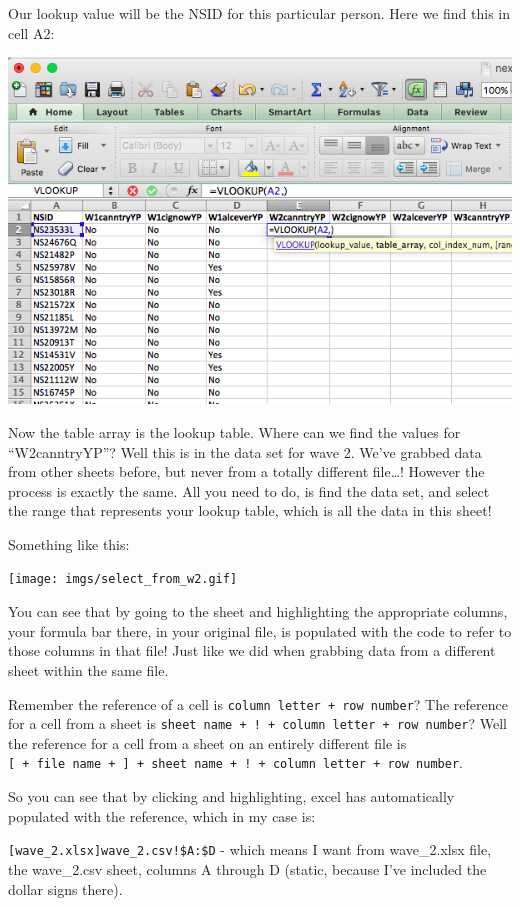 \documentclass[
]{book}
\begin{document}
Our lookup value will be the NSID for this particular person. Here we find this in cell A2:

\includegraphics{imgs/lookup_val_nsid.png}

Now the table array is the lookup table. Where can we find the values for ``W2canntryYP''? Well this is in the data set for wave 2. We've grabbed data from other sheets before, but never from a totally different file\ldots! However the process is exactly the same. All you need to do, is find the data set, and select the range that represents your lookup table, which is all the data in this sheet!

Something like this:

\texttt{[image: imgs/select\_from\_w2.gif]}

You can see that by going to the sheet and highlighting the appropriate columns, your formula bar there, in your original file, is populated with the code to refer to those columns in that file! Just like we did when grabbing data from a different sheet within the same file.

Remember the reference of a cell is \texttt{column\ letter\ +\ row\ number}? The reference for a cell from a sheet is \texttt{sheet\ name\ +\ !\ +\ column\ letter\ +\ row\ number}? Well the reference for a cell from a sheet on an entirely different file is \texttt{{[}\ +\ file\ name\ +\ {]}\ +\ sheet\ name\ +\ !\ +\ column\ letter\ +\ row\ number}.

So you can see that by clicking and highlighting, excel has automatically populated with the reference, which in my case is:

\texttt{{[}wave\_2.xlsx{]}wave\_2.csv!\$A:\$D} - which means I want from wave\_2.xlsx file, the wave\_2.csv sheet, columns A through D (static, because I've included the dollar signs there).
\end{document}
